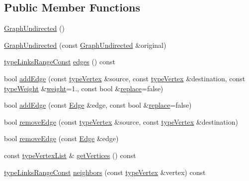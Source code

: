 \subsection*{Public Member Functions}
\begin{DoxyCompactItemize}
\item 
\hyperlink{classGraphUndirected_a00b1e3fe0aaa6fd6e63b94920e40a0ed}{Graph\+Undirected} ()
\item 
\hyperlink{classGraphUndirected_a882c4cec7971177f9eab04319b5b0b62}{Graph\+Undirected} (const \hyperlink{classGraphUndirected}{Graph\+Undirected} \&original)
\item 
\hyperlink{graphInterface_8h_ae8d27008f15586bbf419af7ad2e0a48a}{type\+Links\+Range\+Const} \hyperlink{classGraphUndirected_aa6fa3435fb456f1a7e9642b631878431}{edges} () const
\item 
bool \hyperlink{classGraphUndirected_a2be69d987f3b4fa1cf547898d30b47d2}{add\+Edge} (const \hyperlink{edge_8h_a5fbd20c46956d479cb10afc9855223f6}{type\+Vertex} \&source, const \hyperlink{edge_8h_a5fbd20c46956d479cb10afc9855223f6}{type\+Vertex} \&destination, const \hyperlink{edge_8h_a2e7ea3be891ac8b52f749ec73fee6dd2}{type\+Weight} \&\hyperlink{classGraphUndirected_ae40d431c92d8b4884c7915c44d42f356}{weight}=1., const bool \&\hyperlink{classGraphUndirected_aee3bc279ffe39f8efb7dd60865279474}{replace}=false)
\item 
bool \hyperlink{classGraphUndirected_a366c8b7dbf1cbfe408d5399ad64494dc}{add\+Edge} (const \hyperlink{classEdge}{Edge} \&edge, const bool \&\hyperlink{classGraphUndirected_aee3bc279ffe39f8efb7dd60865279474}{replace}=false)
\item 
bool \hyperlink{classGraphUndirected_af4a40541132a66c9b688a20958057751}{remove\+Edge} (const \hyperlink{edge_8h_a5fbd20c46956d479cb10afc9855223f6}{type\+Vertex} \&source, const \hyperlink{edge_8h_a5fbd20c46956d479cb10afc9855223f6}{type\+Vertex} \&destination)
\item 
bool \hyperlink{classGraphUndirected_ad39275e7a8f7a39734916b8c5400a1d6}{remove\+Edge} (const \hyperlink{classEdge}{Edge} \&edge)
\item 
const \hyperlink{graphInterface_8h_a21d54d8a139def524d3b0d6f71ec4974}{type\+Vertex\+List} \& \hyperlink{classGraphUndirected_af2f65109919c878a1fd7637d3bfe0991}{get\+Vertices} () const
\item 
\hyperlink{graphInterface_8h_ae8d27008f15586bbf419af7ad2e0a48a}{type\+Links\+Range\+Const} \hyperlink{classGraphUndirected_ad9058dbbd7e6d2930a6a233e8b6b0547}{neighbors} (const \hyperlink{edge_8h_a5fbd20c46956d479cb10afc9855223f6}{type\+Vertex} \&vertex) const

\end{DoxyCompactItemize}
